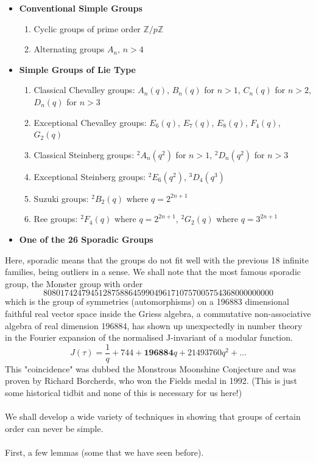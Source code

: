 \begin{itemize}
    \item \textbf{Conventional Simple Groups}
    \begin{enumerate}
        \item Cyclic groups of prime order $\mathbb{Z}/p\mathbb{Z}$
        \item Alternating groups $A_n$, $n > 4$
    \end{enumerate}

    \item \textbf{Simple Groups of Lie Type}
    \begin{enumerate}
        \item Classical Chevalley groups:
        $A_n(q)$, $B_n(q)$ for $n > 1$,
        $C_n(q)$ for $n > 2$, $D_n(q)$ for $n > 3$

        \item Exceptional Chevalley groups:
        $E_6(q)$, $E_7(q)$, $E_8(q)$, $F_4(q)$, $G_2(q)$

        \item Classical Steinberg groups:
        ${}^2A_n(q^2)$ for $n > 1$,
        ${}^2D_n(q^2)$ for $n > 3$

        \item Exceptional Steinberg groups:
        ${}^2E_6(q^2)$, ${}^3D_4(q^3)$

        \item Suzuki groups:
        ${}^2B_2(q)$ where $q = 2^{2n+1}$

        \item Ree groups:
        ${}^2F_4(q)$ where $q = 2^{2n+1}$,
        ${}^2G_2(q)$ where $q = 3^{2n+1}$
    \end{enumerate}

    \item \textbf{One of the 26 Sporadic Groups}
\end{itemize}

Here, sporadic means that the groups do not fit well with the previous 18 infinite families, being outliers in a sense. We shall note that the most famous sporadic group, the Monster group with order \[808017424794512875886459904961710757005754368000000000\]
\noindent which is the group of symmetries (automorphisms) on a 196883 dimensional faithful real vector space inside the Griess algebra, a commutative non-associative algebra of real dimension 196884, has shown up unexpectedly in number theory in the Fourier expansion of the normalised J-invariant of a modular function. 
\[J(\tau) = \frac{1}{q} + 744 + \textbf{196884}q + 21493760q^2 + \dots\]
This "coincidence" was dubbed the Monstrous Moonshine Conjecture and was proven by Richard Borcherds, who won the Fields medal in 1992. (This is just some historical tidbit and none of this is necessary for us here!)
\\\\
We shall develop a wide variety of techniques in showing that groups of certain order can never be simple.
\\\\
First, a few lemmas (some that we have seen before).

